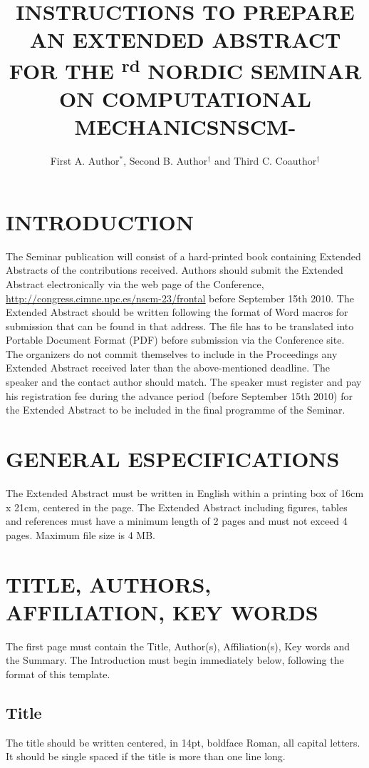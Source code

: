 \documentclass{nordic}
\title{INSTRUCTIONS TO PREPARE AN EXTENDED ABSTRACT FOR THE
 \NSCM\textsuperscript{rd} NORDIC SEMINAR ON COMPUTATIONAL MECHANICS\break NSCM-\NSCM}
\author{First A. Author$^*$, Second B. Author$^\dag$ and Third C. Coauthor$^\dag$}
\newcommand{\NSCM}{23}
\newcommand{\submissiondate}{September 15th 2010}
\newcommand{\submissionpage}{http://congress.cimne.upc.es/nscm-\NSCM/frontal}
\begin{document}
\maketitle

\section{INTRODUCTION}

The Seminar publication will consist of a hard-printed book
containing Extended Abstracts of the contributions received.
Authors should submit the Extended Abstract electronically via the
web page of the Conference,
\underline{\url{\submissionpage}} before \submissiondate.
The Extended Abstract should be written following the
format of Word macros for submission that can be found in that
address. The file has to be translated into Portable Document
Format (PDF) before submission via the Conference site. The
organizers do not commit themselves to include in the Proceedings
any Extended Abstract received later than the above-mentioned
deadline. The speaker and the contact author should match. The
speaker must register and pay his registration fee during the
advance period (before \submissiondate) for the Extended
Abstract to be included in the final programme of the Seminar.

\section{GENERAL ESPECIFICATIONS}

The Extended Abstract must be written in English within a printing
box of 16cm x 21cm, centered in the page. The Extended Abstract
including figures, tables and references must have a minimum
length of 2 pages and must not exceed 4 pages. Maximum file size
is 4 MB.

\section{TITLE, AUTHORS, AFFILIATION, KEY WORDS}

The first page must contain the Title, Author(s), Affiliation(s),
Key words and the Summary. The Introduction must begin immediately
below, following the format of this template.

\subsection{Title}

The title should be written centered, in 14pt, boldface Roman, all
capital letters. It should be single spaced if the title is more
than one line long.
\end{document}

